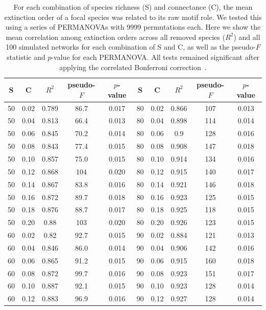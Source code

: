 \documentclass[12pt]{article}
\begin{document}
\begin{spacing}{2.0}
		\begin{table}[h!]
			\caption{For each combination of species richness (S) and connectance (C), the mean extinction order of a focal species was related to its raw motif role. We tested this using a series of PERMANOVAs with 9999 permutations each. Here we show the mean correlation among extinction orders across all removed species ($R^2$) and all 100 simulated networks for each combination of S and C, as well as the pseudo-$F$ statistic and $p$-value for each PERMANOVA. All tests remained significant after applying the correlated Bonferroni correction~\citep{Drezner2016}.}
			\label{permtable}
			\begin{tabular}{c c | c | c c ||c c | c | c c |}
				S	&	C	&	$R^2$	&	pseudo-$F$	&	$p$-value	&	S	&	C &	$R^2$	&	pseudo-$F$	&	$p$-value\\ 
				\hline
				50	&	0.02	&	0.789	&	86.7	&	0.017	&	80	&	0.02	&	0.866	&	107	&	0.013	\\
				50	&	0.04	&	0.813	&	66.4	&	0.013	&	80	&	0.04	&	0.898	&	114	&	0.014	\\
				50	&	0.06	&	0.845	&	70.2	&	0.014	&	80	&	0.06	&	0.9	&	128	&	0.016	\\  
				50	&	0.08	&	0.843	&	77.4	&	0.015	&	80	&	0.08	&	0.908	&	147	&	0.018	\\
				50	&	0.10	&	0.857	&	75.0	&	0.015	&	80	&	0.10	&	0.914	&	134	&	0.016	\\
				50	&	0.12	&	0.868	&	104	&	0.020	&	80	&	0.12	&	0.915	&	140	&	0.017	\\
				50	&	0.14	&	0.867	&	83.8	&	0.016	&	80	&	0.14	&	0.921	&	146	&	0.018	\\
				50	&	0.16	&	0.872	&	89.7	&	0.018	&	80	&	0.16	&	0.923	&	125	&	0.015	\\
				50	&	0.18	&	0.876	&	88.7	&	0.017	&	80	&	0.18	&	0.925	&	118	&	0.015	\\
				50	&	0.20	&	0.88	&	103	&	0.020	&	80	&	0.20	&	0.926	&	123	&	0.015	\\
				60	&	0.02	&	0.82	&	92.7	&	0.015	&	90	&	0.02	&	0.884	&	121	&	0.013	\\
				60	&	0.04	&	0.846	&	86.0	&	0.014	&	90	&	0.04	&	0.906	&	142	&	0.016	\\
				60	&	0.06	&	0.865	&	91.2	&	0.015	&	90	&	0.06	&	0.915	&	160	&	0.018	\\
				60	&	0.08	&	0.872	&	99.7	&	0.016	&	90	&	0.08	&	0.923	&	151	&	0.017	\\
				60	&	0.10	&	0.887	&	92.1	&	0.015	&	90	&	0.10	&	0.923	&	128	&	0.014	\\
				60	&	0.12	&	0.883	&	96.9	&	0.016	&	90	&	0.12	&	0.927	&	128	&	0.014	\\

\end{tabular}
\end{table}
\end{spacing}
\end{document}
